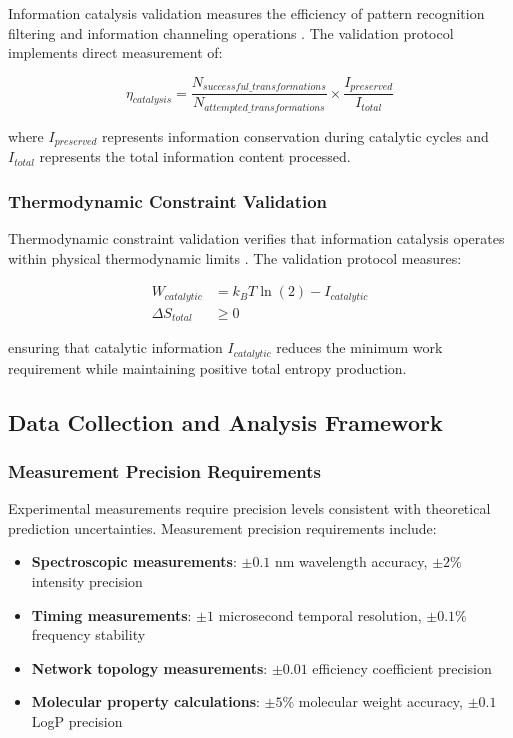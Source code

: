 Information catalysis validation measures the efficiency of pattern recognition filtering and information channeling operations \cite{mizraji2007biological}. The validation protocol implements direct measurement of:

\begin{equation}
\eta_{catalysis} = \frac{N_{successful\_transformations}}{N_{attempted\_transformations}} \times \frac{I_{preserved}}{I_{total}}
\end{equation}

where $I_{preserved}$ represents information conservation during catalytic cycles and $I_{total}$ represents the total information content processed.

\subsubsection{Thermodynamic Constraint Validation}

Thermodynamic constraint validation verifies that information catalysis operates within physical thermodynamic limits \cite{landauer1961irreversibility}. The validation protocol measures:

\begin{align}
W_{catalytic} &= k_B T \ln(2) - I_{catalytic} \\
\Delta S_{total} &\geq 0
\end{align}

ensuring that catalytic information $I_{catalytic}$ reduces the minimum work requirement while maintaining positive total entropy production.

\subsection{Data Collection and Analysis Framework}

\subsubsection{Measurement Precision Requirements}

Experimental measurements require precision levels consistent with theoretical prediction uncertainties. Measurement precision requirements include:

\begin{itemize}
\item \textbf{Spectroscopic measurements}: $\pm 0.1$ nm wavelength accuracy, $\pm 2\%$ intensity precision
\item \textbf{Timing measurements}: $\pm 1$ microsecond temporal resolution, $\pm 0.1\%$ frequency stability
\item \textbf{Network topology measurements}: $\pm 0.01$ efficiency coefficient precision
\item \textbf{Molecular property calculations}: $\pm 5\%$ molecular weight accuracy, $\pm 0.1$ LogP precision
\end{itemize}

